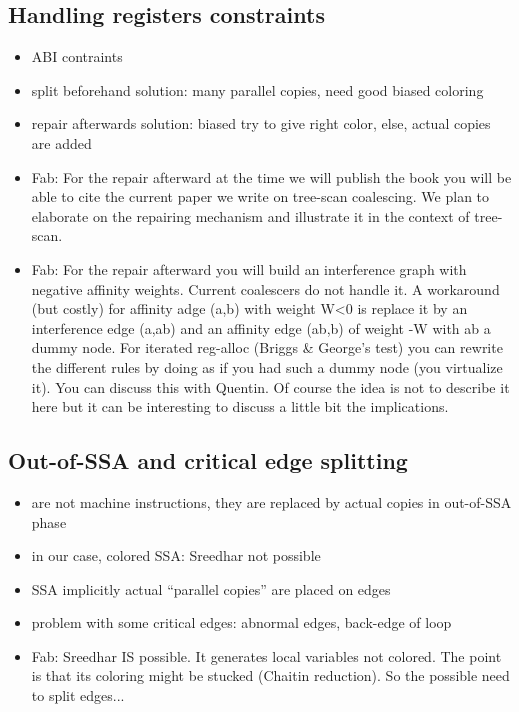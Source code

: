 {\subsection{Handling registers constraints}
\begin{itemize}
  \item ABI contraints
  \item split beforehand solution: many parallel copies, need good biased 
    coloring
  \item repair afterwards solution: biased try to give right color, else, 
    actual copies are added
  \item Fab: For the repair afterward at the time we will publish the book you will be able to cite the current paper we write on tree-scan coalescing. We plan to elaborate on the repairing mechanism and illustrate it in the context of tree-scan.
  \item Fab: For the repair afterward you will build an interference graph with negative 
affinity weights. Current coalescers do not handle it. A workaround (but 
costly) for affinity adge (a,b) with weight W<0 is replace it by an 
interference edge (a,ab) and an affinity edge (ab,b) of weight -W with ab a 
dummy node. For iterated reg-alloc (Briggs \& George's test) you can rewrite the different rules by doing as if you had such a dummy node (you virtualize it). You can discuss this with Quentin. Of course the idea is not to describe it here but it can be interesting to discuss a little bit the implications.
\end{itemize}


\subsection{Out-of-SSA and critical edge splitting}
\begin{itemize}
  \item \phifuns are not machine instructions, they are replaced by actual 
    copies in out-of-SSA phase
  \item in our case, colored SSA: Sreedhar not possible
  \item SSA implicitly 
    actual ``parallel copies'' are placed on edges
  \item problem with some critical edges: abnormal edges, back-edge of loop
  \item Fab: Sreedhar IS possible. It generates local variables not colored.
The point is that its coloring might be stucked (Chaitin reduction). So the possible need to split edges...
\end{itemize}


}
